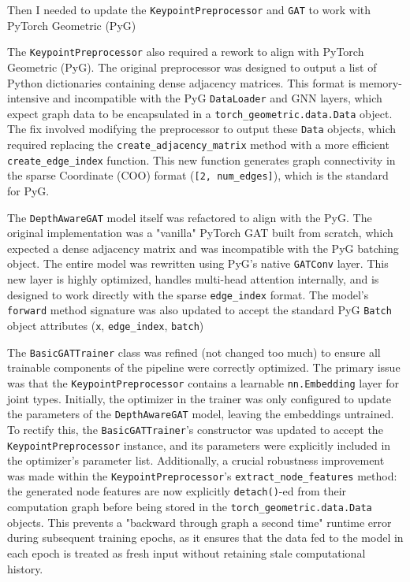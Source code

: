 Then I needed to update the \texttt{KeypointPreprocessor} and \texttt{GAT}
to work with PyTorch Geometric (PyG)

The \texttt{KeypointPreprocessor} also required a rework to align with PyTorch
Geometric (PyG). The original preprocessor was designed to output a list of
Python dictionaries containing dense adjacency matrices. This format is
memory-intensive and incompatible with the PyG \texttt{DataLoader} and GNN
layers, which expect graph data to be encapsulated in a
\texttt{torch\_geometric.data.Data} object. The fix involved modifying the
preprocessor to output these \texttt{Data} objects, which required replacing
the \texttt{create\_adjacency\_matrix} method with a more efficient
\texttt{create\_edge\_index} function. This new function generates graph
connectivity in the sparse Coordinate (COO) format (\texttt{[2, num\_edges]}),
which is the standard for PyG.

The \texttt{DepthAwareGAT} model itself was refactored to align with the PyG.
The original implementation was a "vanilla" PyTorch GAT built from scratch,
which expected a dense adjacency matrix and was incompatible with the PyG
batching object. The entire model was rewritten using PyG's native
\texttt{GATConv} layer. This new layer is highly optimized, handles multi-head
attention internally, and is designed to work directly with the sparse
\texttt{edge\_index} format. The model's \texttt{forward} method signature was
also updated to accept the standard PyG \texttt{Batch} object attributes
(\texttt{x}, \texttt{edge\_index}, \texttt{batch})


The \texttt{BasicGATTrainer} class was refined (not changed too much) to ensure all trainable
components of the pipeline were correctly optimized. The primary issue was that
the \texttt{KeypointPreprocessor} contains a learnable \texttt{nn.Embedding}
layer for joint types. Initially, the optimizer in the trainer was only
configured to update the parameters of the \texttt{DepthAwareGAT} model,
leaving the embeddings untrained. To rectify this, the
\texttt{BasicGATTrainer}'s constructor was updated to accept the
\texttt{KeypointPreprocessor} instance, and its parameters were explicitly
included in the optimizer's parameter list. Additionally, a crucial robustness
improvement was made within the \texttt{KeypointPreprocessor}'s
\texttt{extract\_node\_features} method: the generated node features are now
explicitly \texttt{detach()}-ed from their computation graph before being
stored in the \texttt{torch\_geometric.data.Data} objects. This prevents a
"backward through graph a second time" runtime error during subsequent training
epochs, as it ensures that the data fed to the model in each epoch is treated
as fresh input without retaining stale computational history.


